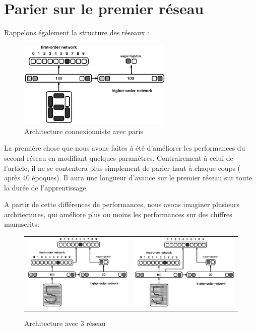 \documentclass[a4paper,12pt]{article}
\begin{document}
\section{Parier sur le premier réseau}

Rappelons également la structure des réseaux :
\begin{figure}[h]
\begin{center}
 \includegraphics[width=280px]{../cleeremans_2007/digital_reco/schema.png}
\end{center}
 \caption{ \protect \footnotemark Architecture connexionniste avec paris  }
\end{figure}

La première chose que nous avons faites à été d'améliorer les performances du second réseau
en modifiant quelques paramètres. Contrairement à celui de l'article, il ne se contentera 
plus simplement de parier haut à chaque coups ( après 40 époques). Il aura une longueur d'avance
sur le premier réseau sur toute la durée de l'apprentissage.

A partir de cette différences de performances, nous avons imaginer plusieurs architectures, qui
améliore plus ou moins les performances sur des chiffres manuscrits:

\begin{figure}[h]
 \begin{center}
\begin{tabular}{c|c}
 \includegraphics[width=210px]{../pre-presentation/thrid.png} & 
 \includegraphics[width=210px]{../pre-presentation/thrid_hidden.png}
\end{tabular}
\end{center}
\caption{Architecture avec 3 réseau}
\end{figure}
\end{document}
